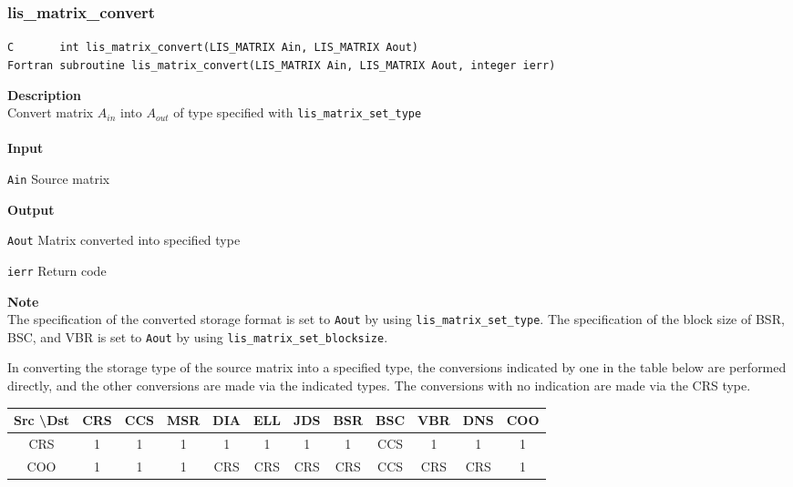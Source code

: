 \documentclass[a4paper]{article}
\newcommand{\namelistlabel}[1]{\mbox{#1}\hfill}
\newenvironment{namelist}[1]{%
 \begin{list}{}
  {\let\makelabel\namelistlabel
  \settowidth{\labelwidth}{#1}
  \setlength{\leftmargin}{1.1\labelwidth}}
}{%
\end{list}}
\begin{document}
  \subsubsection{lis\_matrix\_convert}
\begin{screen}
\verb|C       int lis_matrix_convert(LIS_MATRIX Ain, LIS_MATRIX Aout)|\\
\verb|Fortran subroutine lis_matrix_convert(LIS_MATRIX Ain, LIS_MATRIX Aout, integer ierr)|
\end{screen}
{\bf Description}\\
\indent
Convert matrix $A_{in}$ into $A_{out}$ of type specified with {\tt lis\_matrix\_set\_type}
\\ \\
\noindent
{\bf Input}
\begin{namelist}{XXXXXXXXXXXXXXXXXXXX}
\item[\tt Ain] Source matrix
\end{namelist}
{\bf Output}
\begin{namelist}{XXXXXXXXXXXXXXXXXXXX}
\item[\tt Aout] Matrix converted into specified type
\item[\tt ierr] Return code
\end{namelist}
{\bf Note}\\
\indent
The specification of the converted storage format is set to \verb|Aout| by 
using \verb|lis_matrix_set_type|. 
The specification of the block size of BSR, BSC, and VBR is set to \verb|Aout| by 
using \verb|lis_matrix_set_blocksize|. 

In converting the storage type of the source matrix into a specified type, 
the conversions indicated by one in the table below are performed directly, 
and the other conversions are made via the indicated types. 
The conversions with no indication are made via the CRS type.
\\ \vspace*{5mm}

\begin{tabular}{|c|c|c|c|c|c|c|c|c|c|c|c|}
\hline
Src \textbackslash Dst & CRS & CCS & MSR & DIA & ELL & JDS & BSR & BSC & VBR & DNS & COO \\ \hline
CRS    &  1  &  1  &  1  &  1  &  1  &  1  &  1  &  CCS  &  1  &  1  &  1  \\ \hline
COO    &  1  &  1  &  1  & CRS  & CRS & CRS & CRS & CCS & CRS & CRS &  1  \\ \hline
\end{tabular}
\end{document}
